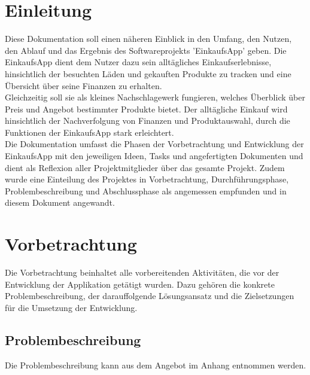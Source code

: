 \documentclass[12pt,a4paper]{article}
\begin{document}
\section*{Einleitung}
Diese Dokumentation soll einen näheren Einblick in den Umfang, den Nutzen, den Ablauf und das Ergebnis des Softwareprojekts 'EinkaufsApp' geben.  
Die EinkaufsApp dient dem Nutzer dazu sein alltägliches Einkaufserlebnisse, hinsichtlich der besuchten Läden und gekauften Produkte zu tracken und eine Übersicht über seine Finanzen zu erhalten.
\\
Gleichzeitig soll sie als kleines Nachschlagewerk fungieren, welches Überblick über Preis und Angebot bestimmter Produkte bietet.
Der alltägliche Einkauf wird hinsichtlich der Nachverfolgung von Finanzen und Produktauswahl, durch die Funktionen der EinkaufsApp stark erleichtert.
\\
Die Dokumentation umfasst die Phasen der Vorbetrachtung und Entwicklung der EinkaufsApp mit den jeweiligen Ideen, Tasks und angefertigten Dokumenten und dient als Reflexion aller Projektmitglieder über das gesamte Projekt.
Zudem wurde eine Einteilung des Projektes in Vorbetrachtung, Durchführungsphase, Problembeschreibung und Abschlussphase als angemessen empfunden und in diesem Dokument angewandt.
\newpage
\section{Vorbetrachtung}
Die Vorbetrachtung beinhaltet alle vorbereitenden Aktivitäten, die vor der Entwicklung der Applikation getätigt wurden. Dazu gehören die konkrete Problembeschreibung, der darauffolgende Lösungsansatz und die Zielsetzungen für die Umsetzung der Entwicklung.


\subsection{Problembeschreibung}

Die Problembeschreibung kann aus dem Angebot im Anhang entnommen werden.

\end{document}
